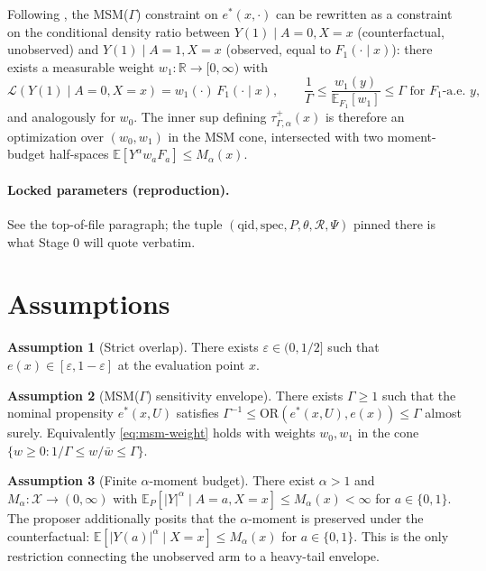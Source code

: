 \documentclass[11pt]{article}
\newcommand{\E}{\mathbb{E}}
\newcommand{\R}{\mathbb{R}}
\theoremstyle{definition}
\newtheorem{assumption}{Assumption}
\theoremstyle{plain}
\theoremstyle{remark}
\begin{document}
Following \cite{Tan2006MSM}, the MSM($\Gamma$) constraint on $e^\ast(x,\cdot)$ can be rewritten as a constraint on the conditional density ratio between $Y(1)\mid A=0, X=x$ (counterfactual, unobserved) and $Y(1)\mid A=1, X=x$ (observed, equal to $F_1(\cdot\mid x)$): there exists a measurable weight $w_1: \R\to[0,\infty)$ with
\begin{equation}\label{eq:msm-weight}
  \mathcal{L}(Y(1)\mid A=0, X=x) = w_1(\cdot)\, F_1(\cdot\mid x), \qquad
  \frac{1}{\Gamma}\le \frac{w_1(y)}{\E_{F_1}[w_1]}\le \Gamma \text{ for } F_1\text{-a.e.\ } y,
\end{equation}
and analogously for $w_0$. The inner sup defining $\tau^+_{\Gamma,\alpha}(x)$ is therefore an optimization over $(w_0, w_1)$ in the MSM cone, intersected with two moment-budget half-spaces $\E[Y^\alpha w_a F_a]\le M_\alpha(x)$.

\paragraph{Locked parameters (reproduction).} See the top-of-file paragraph; the tuple $(\text{qid}, \text{spec}, P, \theta, \mathcal{R}, \Psi)$ pinned there is what Stage 0 will quote verbatim.

\section{Assumptions}

\begin{assumption}[Strict overlap]\label{ass:overlap}
There exists $\varepsilon\in(0, 1/2]$ such that $e(x)\in[\varepsilon, 1-\varepsilon]$ at the evaluation point $x$.
\end{assumption}

\begin{assumption}[MSM($\Gamma$) sensitivity envelope]\label{ass:msm}
There exists $\Gamma\ge 1$ such that the nominal propensity $e^\ast(x, U)$ satisfies $\Gamma^{-1}\le \mathrm{OR}(e^\ast(x, U), e(x))\le \Gamma$ almost surely. Equivalently \eqref{eq:msm-weight} holds with weights $w_0, w_1$ in the cone $\{w\ge 0: 1/\Gamma\le w/\bar w\le \Gamma\}$.
\end{assumption}

\begin{assumption}[Finite $\alpha$-moment budget]\label{ass:moment}
There exist $\alpha>1$ and $M_\alpha:\mathcal{X}\to(0,\infty)$ with $\E_P[|Y|^\alpha\mid A=a, X=x]\le M_\alpha(x)<\infty$ for $a\in\{0,1\}$. The proposer additionally posits that the $\alpha$-moment is preserved under the counterfactual: $\E[|Y(a)|^\alpha\mid X=x]\le M_\alpha(x)$ for $a\in\{0,1\}$. This is the only restriction connecting the unobserved arm to a heavy-tail envelope.
\end{assumption}
\end{document}
